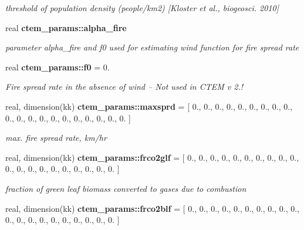 \begin{DoxyCompactItemize}
\begin{DoxyCompactList}\small\item\em threshold of population density (people/km2) \mbox{[}Kloster et al., biogeosci. 2010\mbox{]} \end{DoxyCompactList}\item 
\hypertarget{namespacectem__params_aa722898e44ec14ac7b561ee2917529a5}{}real {\bfseries ctem\+\_\+params\+::alpha\+\_\+fire}\label{namespacectem__params_aa722898e44ec14ac7b561ee2917529a5}

\begin{DoxyCompactList}\small\item\em parameter alpha\+\_\+fire and f0 used for estimating wind function for fire spread rate \end{DoxyCompactList}\item 
\hypertarget{namespacectem__params_af0e5f58c072516e8d0d757f843161bc5}{}real {\bfseries ctem\+\_\+params\+::f0} = 0.\label{namespacectem__params_af0e5f58c072516e8d0d757f843161bc5}

\begin{DoxyCompactList}\small\item\em Fire spread rate in the absence of wind -- Not used in C\+T\+E\+M v 2.! \end{DoxyCompactList}\item 
\hypertarget{namespacectem__params_a9eac43cb4ce26be279a87b758a8dece2}{}real, dimension(kk) {\bfseries ctem\+\_\+params\+::maxsprd} = \mbox{[} 0., 0., 0., 0., 0., 0., 0., 0., 0., 0., 0., 0., 0., 0., 0., 0., 0., 0., 0., 0. \mbox{]}\label{namespacectem__params_a9eac43cb4ce26be279a87b758a8dece2}

\begin{DoxyCompactList}\small\item\em max. fire spread rate, km/hr \end{DoxyCompactList}\item 
\hypertarget{namespacectem__params_a375be0a1145e49eeea706777032433d0}{}real, dimension(kk) {\bfseries ctem\+\_\+params\+::frco2glf} = \mbox{[} 0., 0., 0., 0., 0., 0., 0., 0., 0., 0., 0., 0., 0., 0., 0., 0., 0., 0., 0., 0. \mbox{]}\label{namespacectem__params_a375be0a1145e49eeea706777032433d0}

\begin{DoxyCompactList}\small\item\em fraction of green leaf biomass converted to gases due to combustion \end{DoxyCompactList}\item 
\hypertarget{namespacectem__params_a9a3a13ca8c1ce9a4b4eafa3ce20308f1}{}real, dimension(kk) {\bfseries ctem\+\_\+params\+::frco2blf} = \mbox{[} 0., 0., 0., 0., 0., 0., 0., 0., 0., 0., 0., 0., 0., 0., 0., 0., 0., 0., 0., 0. \mbox{]}\label{namespacectem__params_a9a3a13ca8c1ce9a4b4eafa3ce20308f1}


\end{DoxyCompactItemize}
